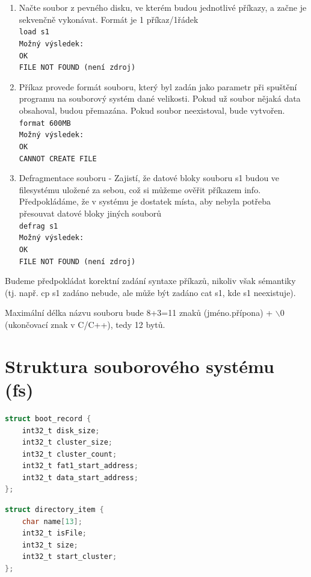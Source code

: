 \documentclass[12pt]{report}
\begin{document}
\begin{enumerate}
		\item Načte soubor z pevného disku, ve kterém budou jednotlivé příkazy, a začne je sekvenčně vykonávat. Formát je 1 příkaz/1řádek\\
		\texttt{load s1}\\
		\texttt{Možný výsledek:}\\
		\texttt{OK}\\
		\texttt{FILE NOT FOUND (není zdroj)}
		\newpage
		\item Příkaz provede formát souboru, který byl zadán jako parametr při spuštění programu na souborový systém dané velikosti. Pokud už soubor nějaká data obsahoval, budou přemazána. Pokud soubor neexistoval, bude vytvořen.\\
		\texttt{format 600MB}\\
		\texttt{Možný výsledek:}\\
		\texttt{OK}\\
		\texttt{CANNOT CREATE FILE}
		
		\item Defragmentace souboru - Zajistí, že datové bloky souboru s1 budou ve filesystému uložené za sebou, což si můžeme ověřit příkazem info. Předpokládáme, že v systému je dostatek místa, aby nebyla potřeba přesouvat datové bloky jiných souborů\\
		\texttt{defrag s1}\\
		\texttt{Možný výsledek:}\\
		\texttt{OK}\\
		\texttt{FILE NOT FOUND (není zdroj)}		
	\end{enumerate}
	\par Budeme předpokládat korektní zadání syntaxe příkazů, nikoliv však sémantiky (tj. např. cp s1 zadáno nebude, ale může být zadáno cat s1, kde s1 neexistuje).
	\par Maximální délka názvu souboru bude 8+3=11 znaků (jméno.přípona) + $\backslash$0 (ukončovací znak v C/C++), tedy 12 bytů.
	
	\section*{Struktura souborového systému (fs)}
			\begin{minipage}[b]{0.45\linewidth}
		\centering
		\begin{lstlisting}[language=C, caption={Super block fs},
			label={source:abbinit}]
struct boot_record {
	int32_t disk_size;
	int32_t cluster_size;
	int32_t cluster_count;
	int32_t fat1_start_address;
	int32_t data_start_address;
};\end{lstlisting}	
	\end{minipage}
	\hspace{0.5cm}
	\begin{minipage}[b]{0.45\linewidth}
		\centering
		\begin{lstlisting}[language=C, caption={Struktura adresáře}, label={source:cbbinit}]
struct directory_item {
	char name[13]; 
	int32_t isFile;
	int32_t size;
	int32_t start_cluster;
};	\end{lstlisting}
	\end{minipage}
	
\end{document}
